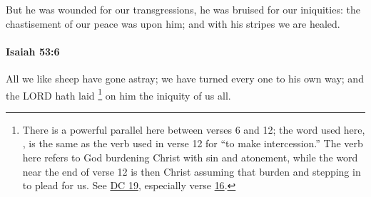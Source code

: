 			But he was wounded for our transgressions, he was bruised for our iniquities: the chastisement of our peace was upon him; and with his stripes we are healed.


		\paragraph{Isaiah 53:6} %
			\label{ISAIAH-53-6}

			All we like sheep have gone astray; we have turned every one to his own way; and the LORD hath laid%
				\footnote{%
					There is a powerful parallel here between verses 6 and 12; the word used here, , is the same as the verb used in verse 12 for ``to make intercession.'' The verb here refers to God burdening Christ with sin and atonement, while the word near the end of verse 12 is then Christ assuming that burden and stepping in to plead for us. See \hyperref[DC19]{DC 19}, especially verse \hyperref[DC19-16]{16}.
					}
			on him the iniquity of us all.

